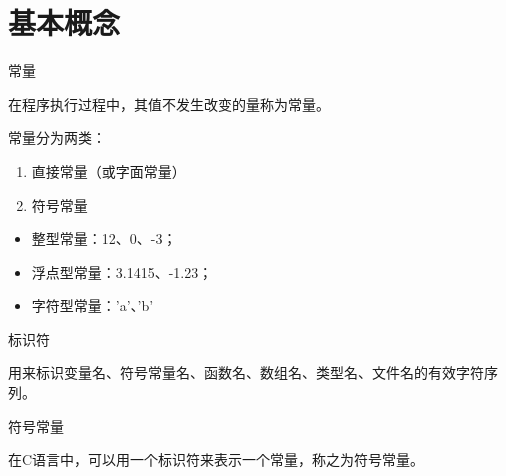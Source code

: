 \section{基本概念}

%

\begin{frame}
\begin{dingyi}\textcolor{acolor3}{常量}

在程序执行过程中，其值不发生改变的量称为常量。
\end{dingyi} \vspace{0.1in}

常量分为两类：\vspace{0.05in}

\begin{enumerate}
\item 直接常量（或字面常量）\\[0.1in]
\item 符号常量
\end{enumerate}
\end{frame}


\begin{frame}

\begin{itemize}
\item 整型常量：12、0、-3；\\[0.1in]
\item 浮点型常量：3.1415、-1.23；\\[0.1in]
\item 字符型常量：'a'、'b'
\end{itemize}
\end{frame}

\begin{frame}[fragile]

\begin{dingyi}\textcolor{acolor3}{标识符}

用来标识变量名、符号常量名、函数名、数组名、类型名、文件名的有效字符序列。
\end{dingyi} \pause \vspace{0.1in}

\begin{dingyi}\textcolor{acolor3}{符号常量}

在C语言中，可以用一个标识符来表示一个常量，称之为符号常量。
\end{dingyi} 
\end{frame}


